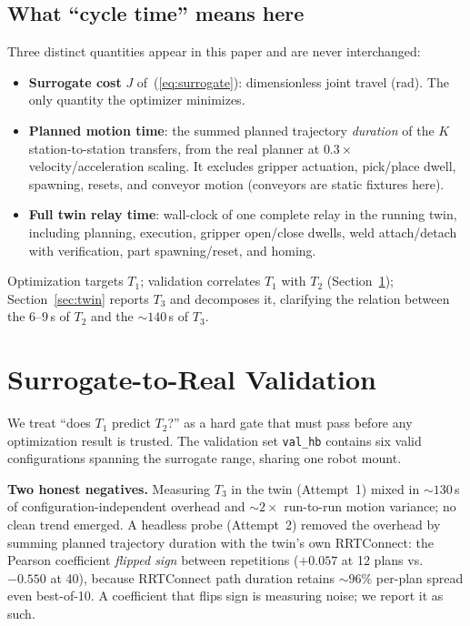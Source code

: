 \documentclass[conference]{IEEEtran}
\begin{document}
\subsection{What ``cycle time'' means here}
\label{sec:terms}
Three distinct quantities appear in this paper and are never interchanged:
\begin{itemize}
\item[$T_1$] \textbf{Surrogate cost} $J$ of~(\ref{eq:surrogate}): dimensionless joint travel
(rad). The only quantity the optimizer minimizes.
\item[$T_2$] \textbf{Planned motion time}: the summed planned trajectory \emph{duration} of the
$K$ station-to-station transfers, from the real planner at $0.3\times$
velocity/acceleration scaling. It excludes gripper actuation, pick/place dwell, spawning,
resets, and conveyor motion (conveyors are static fixtures here).
\item[$T_3$] \textbf{Full twin relay time}: wall-clock of one complete relay in the running
twin, including planning, execution, gripper open/close dwells, weld attach/detach with
verification, part spawning/reset, and homing.
\end{itemize}
Optimization targets $T_1$; validation correlates $T_1$ with $T_2$
(Section~\ref{sec:gate}); Section~\ref{sec:twin} reports $T_3$ and decomposes it, clarifying the
relation between the $6$--$9$\,s of $T_2$ and the $\sim\!140$\,s of $T_3$.

\section{Surrogate-to-Real Validation}
\label{sec:gate}
We treat ``does $T_1$ predict $T_2$?'' as a hard gate that must pass before any optimization
result is trusted. The validation set \texttt{val\_hb} contains six valid configurations
spanning the surrogate range, sharing one robot mount.

\textbf{Two honest negatives.} Measuring $T_3$ in the twin (Attempt~1) mixed in
$\sim\!130$\,s of configuration-independent overhead and $\sim\!2\times$ run-to-run motion
variance; no clean trend emerged. A headless probe (Attempt~2) removed the overhead by summing
planned trajectory duration with the twin's own RRTConnect: the Pearson coefficient
\emph{flipped sign} between repetitions ($+0.057$ at 12 plans vs.\ $-0.550$ at 40), because
RRTConnect path duration retains $\sim\!96\%$ per-plan spread even best-of-10. A coefficient
that flips sign is measuring noise; we report it as such.
\end{document}
